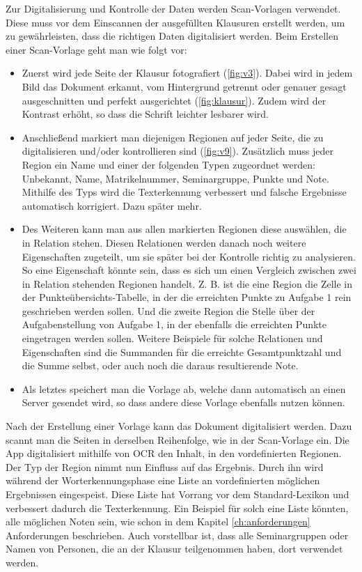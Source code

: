 \documentclass[nomenclature, oneside, 150]{HSMW-Thesis}
\begin{document}
	Zur Digitalisierung und Kontrolle der Daten werden Scan-Vorlagen verwendet. Diese muss vor dem Einscannen der ausgefüllten Klausuren erstellt werden, um zu gewährleisten, dass die richtigen Daten digitalisiert werden. Beim Erstellen einer Scan-Vorlage geht man wie folgt vor:
	\begin{itemize}
		\item Zuerst wird jede Seite der Klausur fotografiert (\ref{fig:v3}). Dabei wird in jedem Bild das Dokument erkannt, vom Hintergrund getrennt oder genauer gesagt ausgeschnitten und perfekt ausgerichtet (\ref{fig:klausur}). Zudem wird der Kontrast erhöht, so dass die Schrift leichter lesbarer wird.
		
		\item Anschließend markiert man diejenigen Regionen auf jeder Seite, die zu digitalisieren und/oder kontrollieren sind (\ref{fig:v9}). Zusätzlich muss jeder Region ein Name und einer der folgenden Typen zugeordnet werden: Unbekannt, Name, Matrikelnummer, Seminargruppe, Punkte und Note. Mithilfe des Typs wird die Texterkennung verbessert und falsche Ergebnisse automatisch korrigiert. Dazu später mehr.
			
		\item Des Weiteren kann man aus allen markierten Regionen diese auswählen, die in Relation stehen. Diesen Relationen werden danach noch weitere Eigenschaften zugeteilt, um sie später bei der Kontrolle richtig zu analysieren. So eine Eigenschaft könnte sein, dass es sich um einen Vergleich zwischen zwei in Relation stehenden Regionen handelt. Z. B. ist die eine Region die Zelle in der Punkteübersichts-Tabelle, in der die erreichten Punkte zu Aufgabe 1 rein geschrieben werden sollen. Und die zweite Region die Stelle über der Aufgabenstellung von Aufgabe 1, in der ebenfalls die erreichten Punkte eingetragen werden sollen. Weitere Beispiele für solche Relationen und Eigenschaften sind die Summanden für die erreichte Gesamtpunktzahl und die Summe selbst, oder auch noch die daraus resultierende Note.
		
		\item Als letztes speichert man die Vorlage ab, welche dann automatisch an einen Server gesendet wird, so dass andere diese Vorlage ebenfalls nutzen können.
	\end{itemize}
	
	Nach der Erstellung einer Vorlage kann das Dokument digitalisiert werden. Dazu scannt man die Seiten in derselben Reihenfolge, wie in der Scan-Vorlage ein. Die App digitalisiert mithilfe von OCR den Inhalt, in den vordefinierten Regionen. Der Typ der Region nimmt nun Einfluss auf das Ergebnis. Durch ihn wird während der Worterkennungsphase eine Liste an vordefinierten möglichen Ergebnissen eingespeist. Diese Liste hat Vorrang vor dem Standard-Lexikon und verbessert dadurch die Texterkennung. Ein Beispiel für solch eine Liste könnten, alle möglichen Noten sein, wie schon in dem Kapitel \ref{ch:anforderungen} Anforderungen beschrieben. Auch vorstellbar ist, dass alle Seminargruppen oder Namen von Personen, die an der Klausur teilgenommen haben, dort verwendet werden. 
	
\end{document}
